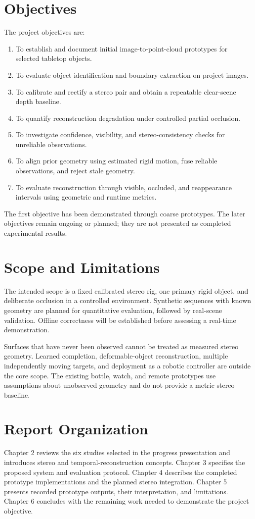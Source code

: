 \section{Objectives}
The project objectives are:
\begin{enumerate}
\item To establish and document initial image-to-point-cloud prototypes for selected tabletop objects.
\item To evaluate object identification and boundary extraction on project images.
\item To calibrate and rectify a stereo pair and obtain a repeatable clear-scene depth baseline.
\item To quantify reconstruction degradation under controlled partial occlusion.
\item To investigate confidence, visibility, and stereo-consistency checks for unreliable observations.
\item To align prior geometry using estimated rigid motion, fuse reliable observations, and reject stale geometry.
\item To evaluate reconstruction through visible, occluded, and reappearance intervals using geometric and runtime metrics.
\end{enumerate}
The first objective has been demonstrated through coarse prototypes. The later objectives remain ongoing or planned; they are not presented as completed experimental results.

\section{Scope and Limitations}
The intended scope is a fixed calibrated stereo rig, one primary rigid object, and deliberate occlusion in a controlled environment. Synthetic sequences with known geometry are planned for quantitative evaluation, followed by real-scene validation. Offline correctness will be established before assessing a real-time demonstration.

Surfaces that have never been observed cannot be treated as measured stereo geometry. Learned completion, deformable-object reconstruction, multiple independently moving targets, and deployment as a robotic controller are outside the core scope. The existing bottle, watch, and remote prototypes use assumptions about unobserved geometry and do not provide a metric stereo baseline.

\section{Report Organization}
Chapter 2 reviews the six studies selected in the progress presentation and introduces stereo and temporal-reconstruction concepts. Chapter 3 specifies the proposed system and evaluation protocol. Chapter 4 describes the completed prototype implementations and the planned stereo integration. Chapter 5 presents recorded prototype outputs, their interpretation, and limitations. Chapter 6 concludes with the remaining work needed to demonstrate the project objective.
